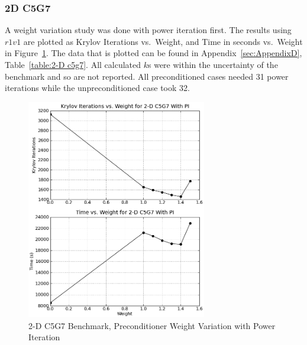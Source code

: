 \documentclass[preprint,12pt]{elsarticle}
\begin{document}
\subsubsection{2D C5G7}

A weight variation study was done with power iteration first. The results using $r1v1$ are plotted as Krylov Iterations vs.\ Weight, and Time in seconds vs.\ Weight in Figure~\ref{fig:2-Dc5g7PI}. The data that is plotted can be found in Appendix~\ref{sec:AppendixD}, Table~\ref{table:2-D c5g7}. All calculated $k$s were within the uncertainty of the benchmark and so are not reported. All preconditioned cases needed 31 power iterations while the unpreconditioned case took 32.
%
\begin{figure}[!ht]
    \begin{center}
      \includegraphics [width=0.7\textwidth, height=0.7\textheight] {2Dc5g7PI}
   \end{center}
   \caption{2-D C5G7 Benchmark, Preconditioner Weight Variation with Power Iteration}
   \label{fig:2-Dc5g7PI}
\end{figure}
\end{document}
